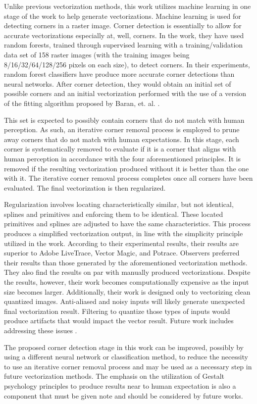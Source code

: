 Unlike previous vectorization methods, this work utilizes machine learning in one stage of the work to help generate vectorizations. Machine learning is used for detecting corners in a raster image. Corner detection is essentially to allow for accurate vectorizations especially at, well, corners. In the work, they have used random forests, trained through supervised learning with a training/validation data set of 158 raster images (with the training images being 8/16/32/64/128/256 pixels on each size), to detect corners. In their experiments, random forest classifiers have produce more accurate corner detections than neural networks. After corner detection, they would obtain an initial set of possible corners and an initial vectorization performed with the use of a version of the fitting algorithm proposed by Baran, et. al. \cite{sketchingclothoidsplines}.

This set is expected to possibly contain corners that do not match with human perception. As such, an iterative corner removal process is employed to prune away corners that do not match with human expectations. In this stage, each corner is systematically removed to evaluate if it is a corner that aligns with human perception in accordance with the four aforementioned principles. It is removed if the resulting vectorization produced without it is better than the one with it. The iterative corner removal process completes once all corners have been evaluated. The final vectorization is then regularized.

Regularization involves locating characteristically similar, but not identical, splines and primitives and enforcing them to be identical. These located primitives and splines are adjusted to have the same characteristics. This process produces a simplified vectorization output, in line with the simplicity principle utilized in the work. According to their experimental results, their results are superior to Adobe LiveTrace, Vector Magic, and Potrace. Observers preferred their results than those generated by the aforementioned vectorization methods. They also find the results on par with manually produced vectorizations. Despite the results, however, their work becomes computationally expensive as the input size becomes larger. Additionally, their work is designed only to vectorizing clean quantized images. Anti-aliased and noisy inputs will likely generate unexpected final vectorization result. Filtering to quantize those types of inputs would produce artifacts that would impact the vector result. Future work includes addressing these issues \cite{hoshyari2018perceptiondriven}.

The proposed corner detection stage in this work can be improved, possibly by using a different neural network or classification method, to reduce the necessity to use an iterative corner removal process and may be used as a necessary step in future vectorization methods. The emphasis on the utilization of Gestalt psychology principles to produce results near to human expectation is also a component that must be given note and should be considered by future works.


